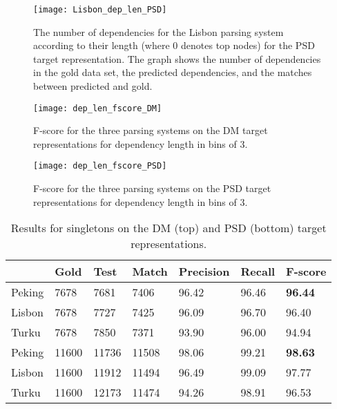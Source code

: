 \begin{figure}[h]
    \centering
    \begin{minipage}{0.8\textwidth}
        \centering
        \texttt{[image: Lisbon\_dep\_len\_PSD]}
    \end{minipage}
    \caption{The number of dependencies for the Lisbon parsing system according to their length (where 0 denotes top nodes) for the PSD target representation. The graph shows the number of dependencies in the gold data set, the predicted dependencies, and the matches between predicted and gold.}
    \label{fig:Lisbon_dep_len_PSD}
\end{figure}

\begin{figure}[h]
    \centering
    \begin{minipage}{0.8\textwidth}
        \centering
        \texttt{[image: dep\_len\_fscore\_DM]}
    \end{minipage}\hfill
    \caption{F-score for the three parsing systems on the DM target representations for dependency length in bins of 3.}
    \label{fig:dep_len_fscore_DM}
\end{figure}

\begin{figure}[h]
    \centering
    \begin{minipage}{0.8\textwidth}
        \centering
        \texttt{[image: dep\_len\_fscore\_PSD]}
    \end{minipage}
    \caption{F-score for the three parsing systems on the PSD target representations for dependency length in bins of 3.}
    \label{fig:dep_len_fscore_PSD}
\end{figure}

\begin{table}
    \centering
    \smaller[0.5]
    \begin{tabular}{@{}lllllll@{}}
        \toprule
        \textbf{ } & \textbf{Gold} & \textbf{Test} & \textbf{Match} & \textbf{Precision} & \textbf{Recall} & \textbf{F-score} \\
        \midrule
        Peking &7678       &7681       &7406       & 96.42     & 96.46     & \textbf{96.44}    \\
        Lisbon &7678       &7727       &7425       & 96.09     & 96.70     & 96.40    \\
        Turku &7678       &7850       &7371       & 93.90    & 96.00     & 94.94    \\
        \midrule
        Peking &11600      &11736      &11508      & 98.06     & 99.21     & \textbf{98.63}    \\
        Lisbon &11600      &11912      &11494      & 96.49     & 99.09     & 97.77    \\
        Turku &11600      &12173      &11474      & 94.26     & 98.91     & 96.53    \\
        \bottomrule
    \end{tabular}
    \caption{Results for singletons on the DM (top) and PSD (bottom) target representations.}
    \label{fig:singletons}
\end{table}

